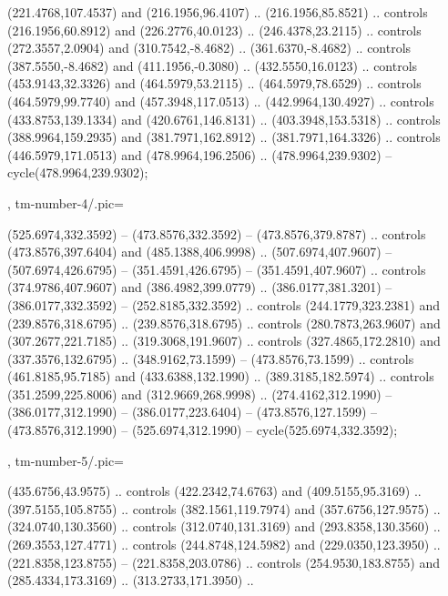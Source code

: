 {{\begin{scope}[y=-0.80pt,x=0.80pt,scale=0.04,yshift=135pt,xshift=-280pt]
      (221.4768,107.4537) and (216.1956,96.4107) .. (216.1956,85.8521) .. controls
      (216.1956,60.8912) and (226.2776,40.0123) .. (246.4378,23.2115) .. controls
      (272.3557,2.0904) and (310.7542,-8.4682) .. (361.6370,-8.4682) .. controls
      (387.5550,-8.4682) and (411.1956,-0.3080) .. (432.5550,16.0123) .. controls
      (453.9143,32.3326) and (464.5979,53.2115) .. (464.5979,78.6529) .. controls
      (464.5979,99.7740) and (457.3948,117.0513) .. (442.9964,130.4927) .. controls
      (433.8753,139.1334) and (420.6761,146.8131) .. (403.3948,153.5318) .. controls
      (388.9964,159.2935) and (381.7971,162.8912) .. (381.7971,164.3326) .. controls
      (446.5979,171.0513) and (478.9964,196.2506) .. (478.9964,239.9302) --
      cycle(478.9964,239.9302);
    \end{scope}
  },
  tm-number-4/.pic={
    \begin{scope}[y=-0.80pt,x=0.80pt,scale=0.04,yshift=195pt,xshift=-310pt]
       (525.6974,332.3592) -- (473.8576,332.3592) --
      (473.8576,379.8787) .. controls (473.8576,397.6404) and (485.1388,406.9998) ..
      (507.6974,407.9607) -- (507.6974,426.6795) -- (351.4591,426.6795) --
      (351.4591,407.9607) .. controls (374.9786,407.9607) and (386.4982,399.0779) ..
      (386.0177,381.3201) -- (386.0177,332.3592) -- (252.8185,332.3592) .. controls
      (244.1779,323.2381) and (239.8576,318.6795) .. (239.8576,318.6795) .. controls
      (280.7873,263.9607) and (307.2677,221.7185) .. (319.3068,191.9607) .. controls
      (327.4865,172.2810) and (337.3576,132.6795) .. (348.9162,73.1599) --
      (473.8576,73.1599) .. controls (461.8185,95.7185) and (433.6388,132.1990) ..
      (389.3185,182.5974) .. controls (351.2599,225.8006) and (312.9669,268.9998) ..
      (274.4162,312.1990) -- (386.0177,312.1990) -- (386.0177,223.6404) --
      (473.8576,127.1599) -- (473.8576,312.1990) -- (525.6974,312.1990) --
      cycle(525.6974,332.3592);
    \end{scope}
  },
  tm-number-5/.pic={
    \begin{scope}[y=-0.80pt,x=0.80pt,scale=0.04,yshift=180pt,xshift=-250pt]
       (435.6756,43.9575) .. controls (422.2342,74.6763)
      and (409.5155,95.3169) .. (397.5155,105.8755) .. controls (382.1561,119.7974)
      and (357.6756,127.9575) .. (324.0740,130.3560) .. controls (312.0740,131.3169)
      and (293.8358,130.3560) .. (269.3553,127.4771) .. controls (244.8748,124.5982)
      and (229.0350,123.3950) .. (221.8358,123.8755) -- (221.8358,203.0786) ..
      controls (254.9530,183.8755) and (285.4334,173.3169) .. (313.2733,171.3950) ..

\end{scope}}}
